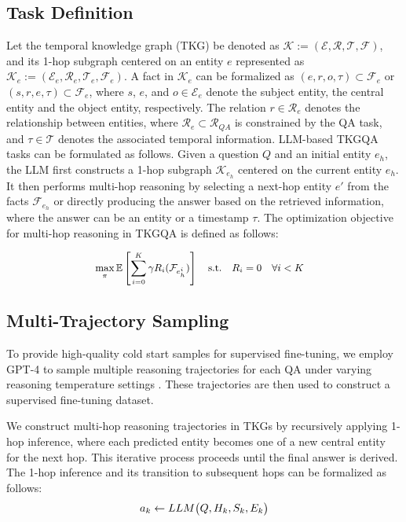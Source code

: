 \documentclass[letterpaper]{article} %
\begin{document}
\subsection{Task Definition}
Let the temporal knowledge graph (TKG) be denoted as $\mathcal{K} := (\mathcal{E}, \mathcal{R}, \mathcal{T}, \mathcal{F})$, and its 1-hop subgraph  centered on an entity $e$ represented as $\mathcal{K}_e := (\mathcal{E}_e, \mathcal{R}_e, \mathcal{T}_e, \mathcal{F}_e)$. A fact in $\mathcal{K}_e$ can be formalized as ${(e, r, o, \tau) \subset \mathcal{F}_e}$ or ${(s, r, e, \tau)} \subset \mathcal{F}_e$, where $s$, $e$, and $o \in \mathcal{E}_e$ denote the subject entity, the central entity and the object entity, respectively. 
The relation $r \in \mathcal{R}_e$ denotes the relationship between entities, where $\mathcal{R}_e \subset \mathcal{R}_{QA}$ is constrained by the QA task, and $\tau \in \mathcal{T}$ denotes the associated temporal information.
LLM-based TKGQA tasks can be formulated as follows. Given a question $Q$ and an initial entity $e_h$, the LLM first constructs a 1-hop subgraph $\mathcal{K}_{e_{h}}$ centered on the current entity $e_h$. It then performs multi-hop reasoning by selecting a next-hop entity $e'$ from the facts $\mathcal{F}_{e_h}$ or directly producing the answer based on the retrieved information, where the answer can be an entity or a timestamp $\tau$. The optimization objective for multi-hop reasoning in TKGQA is defined as follows:
\vspace*{-0.5cm}

\begin{equation}  \small
	\begin{aligned}  
		& \max_{{\pi}} \mathbb{E}\left[ \sum_{i=0}^{K} \gamma R_i(\mathcal{F}_{e^{i}_h}) \right] \quad \text{s.t.} \quad R_i = 0 \quad \forall i < K
	\end{aligned} 
    \label{opt}
\end{equation} 


\subsection{Multi-Trajectory Sampling}
To provide high-quality cold start samples for supervised fine-tuning, we employ GPT-4 to sample multiple reasoning trajectories for each QA under varying reasoning temperature settings . These trajectories are then used to construct a supervised fine-tuning dataset.

We construct multi-hop reasoning trajectories in TKGs by recursively applying 1-hop inference, where each predicted entity becomes one of a new central entity for the next hop. This iterative process proceeds until the final answer is derived. The 1-hop inference and its transition to subsequent hops can be formalized as follows:
\begin{equation}\small
a_k \gets LLM\big(Q, H_k, S_k, E_k\big)
\label{tr.update}
\end{equation}
\end{document}
